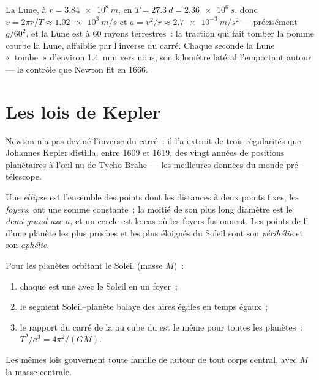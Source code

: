 \begin{example}\label{ex:g12:satellites-kepler:moon}
La Lune, à $r = \qty{3.84e8}{m}$,  en
$T = \qty{27.3}{d} = \qty{2.36e6}{s}$, donc
$v = 2\pi r/T \approx \qty{1.02e3}{m/s}$ et
$a = v^2/r \approx \qty{2.7e-3}{m/s^2}$ --- précisément $g/60^2$, et
la Lune est à $60$ rayons terrestres~: la traction qui fait tomber la
pomme courbe la Lune, affaiblie par l'inverse du carré. Chaque seconde
la Lune «~tombe~» d'environ \qty{1.4}{mm} vers nous, son kilomètre
latéral l'emportant autour --- le contrôle que Newton fit en 1666.
\end{example}

\section{Les lois de Kepler}

Newton n'a pas deviné l'inverse du carré~: il l'a extrait de trois
régularités que Johannes Kepler distilla, entre 1609 et 1619, des vingt
années de positions planétaires à l'œil nu de Tycho Brahe --- les
meilleures données du monde pré-télescope.

\begin{definition}[Ellipse]\label{def:g12:satellites-kepler:ellipse}
Une \emph{ellipse} est l'ensemble des points dont les
distances à deux points fixes, les \emph{foyers}, ont une somme constante~; la moitié de son plus long
diamètre est le \emph{demi-grand axe} $a$, et un
cercle est le cas où les foyers fusionnent. Les points de
l' d'une planète les plus proches et les plus
éloignés du Soleil sont son \emph{périhélie} et son
\emph{aphélie}.
\end{definition}

\begin{theorem}\label{thm:g12:satellites-kepler:kepler}
%
Pour les planètes orbitant le Soleil (masse $M$)~:
\begin{enumerate}
  \item chaque  est une
         avec le Soleil en un foyer~;
  \item le segment Soleil--planète balaye des aires égales en temps
        égaux~;
  \item le rapport du carré de la  au cube du
         est le même pour toutes les planètes~:
        $T^2/a^3 = 4\pi^2/(G M)$.
\end{enumerate}
Les mêmes lois gouvernent toute famille de
 autour de tout corps central, avec $M$ la
masse centrale. \admitted
\end{theorem}

